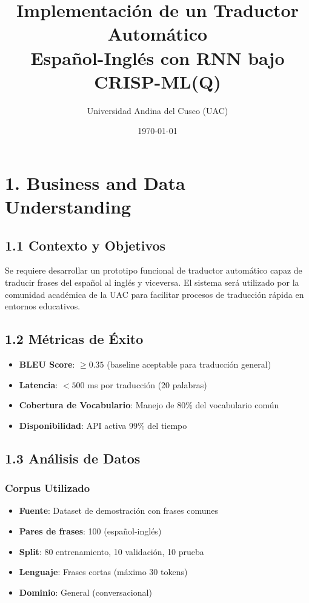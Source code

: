 \documentclass[12pt,a4paper]{article}
\title{Implementación de un Traductor Automático\\Español-Inglés con RNN bajo CRISP-ML(Q)}
\author{Universidad Andina del Cusco (UAC)}
\date{\today}
\begin{document}
\maketitle

\tableofcontents
\newpage

\section{1. Business and Data Understanding}

\subsection{1.1 Contexto y Objetivos}
Se requiere desarrollar un prototipo funcional de traductor automático capaz de traducir frases del español al inglés y viceversa. El sistema será utilizado por la comunidad académica de la UAC para facilitar procesos de traducción rápida en entornos educativos.

\subsection{1.2 Métricas de Éxito}
\begin{itemize}
    \item \textbf{BLEU Score}: $\geq 0.35$ (baseline aceptable para traducción general)
    \item \textbf{Latencia}: $< 500$ ms por traducción (20 palabras)
    \item \textbf{Cobertura de Vocabulario}: Manejo de 80\% del vocabulario común
    \item \textbf{Disponibilidad}: API activa 99\% del tiempo
\end{itemize}

\subsection{1.3 Análisis de Datos}
\label{sec:data_analysis}

\subsubsection{Corpus Utilizado}
\begin{itemize}
    \item \textbf{Fuente}: Dataset de demostración con frases comunes
    \item \textbf{Pares de frases}: 100 (español-inglés)
    \item \textbf{Split}: 80 entrenamiento, 10 validación, 10 prueba
    \item \textbf{Lenguaje}: Frases cortas (máximo 30 tokens)
    \item \textbf{Dominio}: General (conversacional)
\end{itemize}
\end{document}
